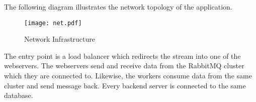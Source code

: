 \documentclass[../documentation.tex]{subfiles}
\begin{document}
The following diagram illustrates the network topology of the application.

\begin{figure}[h]
    \centering
    \texttt{[image: net.pdf]}
    \caption{Network Infrastructure}
\end{figure}

The entry point is a load balancer which redirects the stream
into one of the webservers. The webservers send and receive data
from the RabbitMQ cluster which they are connected to. Likewise,
the workers consume data from the same cluster and send message back.
Every backend server is connected to the same database.
\end{document}
